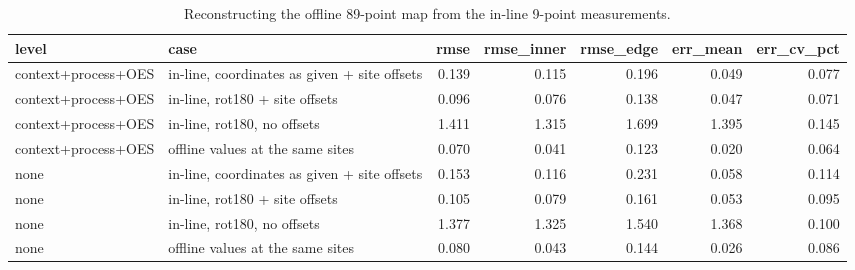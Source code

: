 \begin{table}[t]
\centering
\caption{Reconstructing the offline 89-point map from the in-line 9-point measurements.}
\label{tab:inline}
\footnotesize
\begin{tabular}{llrrrrr}
\toprule
level & case & rmse & rmse\_inner & rmse\_edge & err\_mean & err\_cv\_pct \\
\midrule
context+process+OES & in-line, coordinates as given + site offsets & 0.139 & 0.115 & 0.196 & 0.049 & 0.077 \\
context+process+OES & in-line, rot180 + site offsets & 0.096 & 0.076 & 0.138 & 0.047 & 0.071 \\
context+process+OES & in-line, rot180, no offsets & 1.411 & 1.315 & 1.699 & 1.395 & 0.145 \\
context+process+OES & offline values at the same sites & 0.070 & 0.041 & 0.123 & 0.020 & 0.064 \\
none & in-line, coordinates as given + site offsets & 0.153 & 0.116 & 0.231 & 0.058 & 0.114 \\
none & in-line, rot180 + site offsets & 0.105 & 0.079 & 0.161 & 0.053 & 0.095 \\
none & in-line, rot180, no offsets & 1.377 & 1.325 & 1.540 & 1.368 & 0.100 \\
none & offline values at the same sites & 0.080 & 0.043 & 0.144 & 0.026 & 0.086 \\
\bottomrule
\end{tabular}
\end{table}
